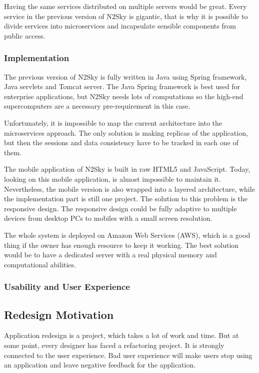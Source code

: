 Having the same services distributed on multiple servers would be great. Every service in the previous version of N2Sky is gigantic, that is why it is possible to divide services into microservices and incapsulate sensible components from public access.


\subsubsection{Implementation}\label{Implementation}

The previous version of N2Sky is fully written in Java using Spring framework, Java servlets and Tomcat server. The Java Spring framework is best used for enterprise applications, but N2Sky needs lots of computations so the high-end supercomputers are a necessary pre-requirement in this case. 

Unfortunately, it is impossible to map the current architecture into the microservices approach. The only solution is making replicas of the application, but then the sessions and data consistency have to be tracked in each one of them.  

The mobile application of N2Sky is built in raw HTML5 and JavaScript. Today, looking on this mobile application, is almost impossible to maintain it. Nevertheless, the mobile version is also wrapped into a layered architecture, while the implementation part is still one project. The solution to this problem is the responsive design. The responsive design could be fully adaptive to multiple devices from desktop PCs to mobiles with a small screen resolution.

The whole system is deployed on Amazon Web Services (AWS), which is a good thing if the owner has enough resource to keep it working. The best solution would be to have a dedicated server with a real physical memory and computational abilities.  


\subsubsection{Usability and User Experience}\label{Usabilityanduserexperience}



\subsection{Redesign Motivation}\label{Redesignmotivation}

Application redesign is a project, which takes a lot of work and time. But at some point, every designer has faced a refactoring project. It is strongly connected to the user experience. Bad user experience will make users stop using an application and leave negative feedback for the application. 


